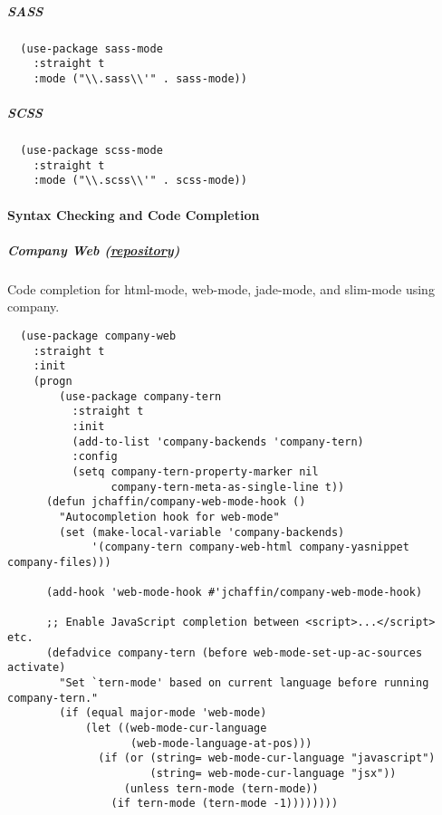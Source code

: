 \documentclass[11pt]{article}
\begin{document}
\subparagraph*{SASS}
\label{sec:org77f2874}

\begin{verbatim}
  (use-package sass-mode
    :straight t
    :mode ("\\.sass\\'" . sass-mode))
\end{verbatim}

\subparagraph*{SCSS}
\label{sec:org2a609c6}

\begin{verbatim}
  (use-package scss-mode
    :straight t
    :mode ("\\.scss\\'" . scss-mode))
\end{verbatim}

\paragraph*{Syntax Checking and Code Completion}
\label{sec:org9bbd284}
\subparagraph*{Company Web (\href{https://github.com/osv/company-web}{repository})}
\label{sec:org4d68ca5}

Code completion for html-mode, web-mode, jade-mode,
and slim-mode using company.

\begin{verbatim}
  (use-package company-web
    :straight t
    :init
    (progn
        (use-package company-tern
          :straight t
          :init
          (add-to-list 'company-backends 'company-tern)
          :config
          (setq company-tern-property-marker nil
                company-tern-meta-as-single-line t))
      (defun jchaffin/company-web-mode-hook ()
        "Autocompletion hook for web-mode"
        (set (make-local-variable 'company-backends)
             '(company-tern company-web-html company-yasnippet company-files)))

      (add-hook 'web-mode-hook #'jchaffin/company-web-mode-hook)

      ;; Enable JavaScript completion between <script>...</script> etc.
      (defadvice company-tern (before web-mode-set-up-ac-sources activate)
        "Set `tern-mode' based on current language before running company-tern."
        (if (equal major-mode 'web-mode)
            (let ((web-mode-cur-language
                   (web-mode-language-at-pos)))
              (if (or (string= web-mode-cur-language "javascript")
                      (string= web-mode-cur-language "jsx"))
                  (unless tern-mode (tern-mode))
                (if tern-mode (tern-mode -1))))))))
\end{verbatim}
\end{document}
